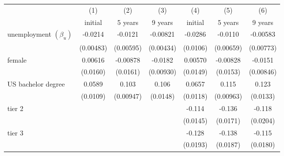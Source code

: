 \begin{table}[htbp]\centering
	\label{tb:table4}
		\begin{adjustbox}{max width=0.8\textwidth}
		\begin{tabular}{l*{6}{c}}
			\hline\hline
			&\multicolumn{1}{c}{(1)}&\multicolumn{1}{c}{(2)}&\multicolumn{1}{c}{(3)}&\multicolumn{1}{c}{(4)}&\multicolumn{1}{c}{(5)}&\multicolumn{1}{c}{(6)}\\
			&\multicolumn{1}{c}{initial}&\multicolumn{1}{c}{5 years}&\multicolumn{1}{c}{9 years}&\multicolumn{1}{c}{initial}&\multicolumn{1}{c}{5 years}&\multicolumn{1}{c}{9 years}\\
\hline
unemployment  $\left( \beta_u \right)$&     -0.0214\sym{***}&     -0.0121\sym{*}  &    -0.00821\sym{*}  &     -0.0286\sym{**} &     -0.0110         &    -0.00583         \\
                    &   (0.00483)         &   (0.00595)         &   (0.00434)         &    (0.0106)         &   (0.00659)         &   (0.00773)         \\
[1em]
female        &     0.00616         &    -0.00878         &     -0.0182\sym{*}  &     0.00570         &    -0.00828         &     -0.0151         \\
                    &    (0.0160)         &    (0.0161)         &   (0.00930)         &    (0.0149)         &    (0.0153)         &   (0.00846)         \\
[1em]
US bachelor degree           &      0.0589\sym{***}&       0.103\sym{***}&       0.106\sym{***}&      0.0657\sym{***}&       0.115\sym{***}&       0.123\sym{***}\\
                    &    (0.0109)         &   (0.00947)         &    (0.0148)         &    (0.0118)         &   (0.00963)         &    (0.0133)         \\
[1em]
tier 2             &                     &                     &                     &      -0.114\sym{***}&      -0.136\sym{***}&      -0.118\sym{***}\\
                    &                     &                     &                     &    (0.0145)         &    (0.0171)         &    (0.0204)         \\
[1em]
tier 3             &                     &                     &                     &      -0.128\sym{***}&      -0.138\sym{***}&      -0.115\sym{***}\\
                    &                     &                     &                     &    (0.0193)         &    (0.0187)         &    (0.0180)         \\

\end{tabular}
\end{adjustbox}
\end{table}
